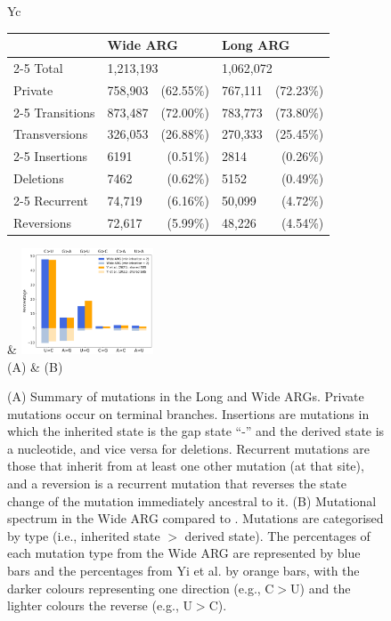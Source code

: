 \documentclass{article}
\begin{document}
\begin{figure} \centering
{}
\begin{tabularx}{\textwidth}{Yc}

\begin{tabular}[b]{llrlr}\toprule
            & \multicolumn{2}{l}{Wide ARG} & \multicolumn{2}{l}{Long ARG} \\
    \cmidrule{2-5}
Total      & \multicolumn{2}{l}{1,213,193} & \multicolumn{2}{l}{1,062,072} \\
Private     & 758,903 & (62.55\%) &  767,111 & (72.23\%)\\
    \cmidrule{2-5}
Transitions & 873,487   & (72.00\%) & 783,773  & (73.80\%) \\
Transversions & 326,053 & (26.88\%) & 270,333  & (25.45\%) \\
    \cmidrule{2-5}
Insertions  & 6191  & (0.51\%) & 2814   & (0.26\%) \\
Deletions   & 7462  & (0.62\%) & 5152   & (0.49\%) \\
    \cmidrule{2-5}
Recurrent   & 74,719 & (6.16\%) & 50,099 & (4.72\%) \\
Reversions  & 72,617 & (5.99\%) & 48,226 & (4.54\%) \\
\bottomrule
\end{tabular}
&
\includegraphics[width=0.35\textwidth]{figures/mutational_spectra.pdf}\\
(A) & (B)\\
\end{tabularx}
\caption{\label{fig:mutational_spectra}
(A) Summary of mutations in the Long and Wide ARGs. Private mutations
occur on terminal branches. Insertions are mutations in which the
inherited state is the gap state ``-'' and the derived state is a
nucleotide, and vice versa for deletions. Recurrent mutations are
those that inherit from at least one other mutation (at that site),
and a reversion is a recurrent mutation that reverses the state change
of the mutation immediately ancestral to it.
(B) Mutational spectrum in
the Wide ARG compared to \cite{Yi2021-sc}. Mutations are
categorised by type (i.e., inherited state $>$ derived state). The percentages
of each mutation type from the Wide ARG are represented by blue bars and the
percentages from Yi et al. by orange bars, with the darker colours representing
one direction (e.g., C$>$U) and the lighter colours the reverse (e.g., U$>$C).}
\end{figure}
\end{document}
